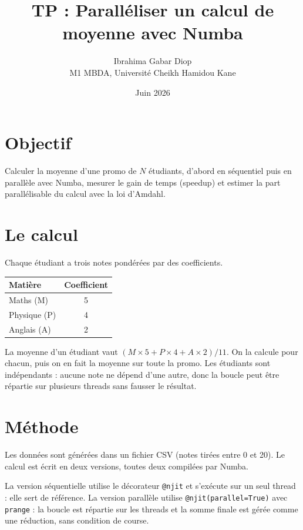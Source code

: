 \documentclass[11pt,a4paper]{article}
\title{TP : Paralléliser un calcul de moyenne avec Numba}
\author{Ibrahima Gabar Diop \\ \small M1 MBDA, Université Cheikh Hamidou Kane}
\date{Juin 2026}
\begin{document}
\maketitle

\section{Objectif}

Calculer la moyenne d'une promo de $N$ étudiants, d'abord en séquentiel puis en
parallèle avec Numba, mesurer le gain de temps (speedup) et estimer la part
parallélisable du calcul avec la loi d'Amdahl.

\section{Le calcul}

Chaque étudiant a trois notes pondérées par des coefficients.

\begin{center}
\begin{tabular}{lc}
\toprule
Matière & Coefficient \\
\midrule
Maths (M) & 5 \\
Physique (P) & 4 \\
Anglais (A) & 2 \\
\bottomrule
\end{tabular}
\end{center}

La moyenne d'un étudiant vaut $(M \times 5 + P \times 4 + A \times 2) / 11$. On la
calcule pour chacun, puis on en fait la moyenne sur toute la promo. Les étudiants
sont indépendants : aucune note ne dépend d'une autre, donc la boucle peut être
répartie sur plusieurs threads sans fausser le résultat.

\section{Méthode}

Les données sont générées dans un fichier CSV (notes tirées entre 0 et 20). Le
calcul est écrit en deux versions, toutes deux compilées par Numba.

La version séquentielle utilise le décorateur \texttt{@njit} et s'exécute sur un
seul thread : elle sert de référence. La version parallèle utilise
\texttt{@njit(parallel=True)} avec \texttt{prange} : la boucle est répartie sur
les threads et la somme finale est gérée comme une réduction, sans condition de
course.
\end{document}
